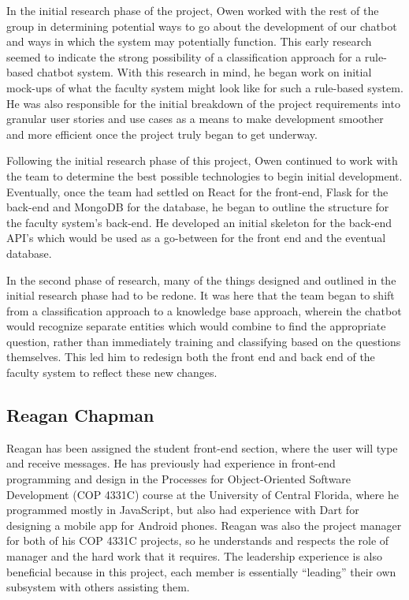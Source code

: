 \documentclass[titlepage, 12pt]{article}
\begin{document}
In the initial research phase of the project, Owen worked with the rest of the group in determining potential ways to go about the development of our chatbot and ways in which the system may potentially function. This early research seemed to indicate the strong possibility of a classification approach for a rule-based chatbot system. With this research in mind, he began work on initial mock-ups of what the faculty system might look like for such a rule-based system. He was also responsible for the initial breakdown of the project requirements into granular user stories and use cases as a means to make development smoother and more efficient once the project truly began to get underway.

Following the initial research phase of this project, Owen continued to work with the team to determine the best possible technologies to begin initial development. Eventually, once the team had settled on React for the front-end, Flask for the back-end and MongoDB for the database, he began to outline the structure for the faculty system’s back-end. He developed an initial skeleton for the back-end API’s which would be used as a go-between for the front end and the eventual database.

In the second phase of research, many of the things designed and outlined in the initial research phase had to be redone. It was here that the team began to shift from a classification approach to a knowledge base approach, wherein the chatbot would recognize separate entities which would combine to find the appropriate question, rather than immediately training and classifying based on the questions themselves. This led him to redesign both the front end and back end of the faculty system to reflect these new changes.


\subsection{Reagan Chapman}

Reagan has been assigned the student front-end section, where the user will type and receive messages. He has previously had experience in front-end programming and design in the Processes for Object-Oriented Software Development (COP 4331C) course at the University of Central Florida, where he programmed mostly in JavaScript, but also had experience with Dart for designing a mobile app for Android phones. Reagan was also the project manager for both of his COP 4331C projects, so he understands and respects the role of manager and the hard work that it requires. The leadership experience is also beneficial because in this project, each member is essentially “leading” their own subsystem with others assisting them.
\end{document}
